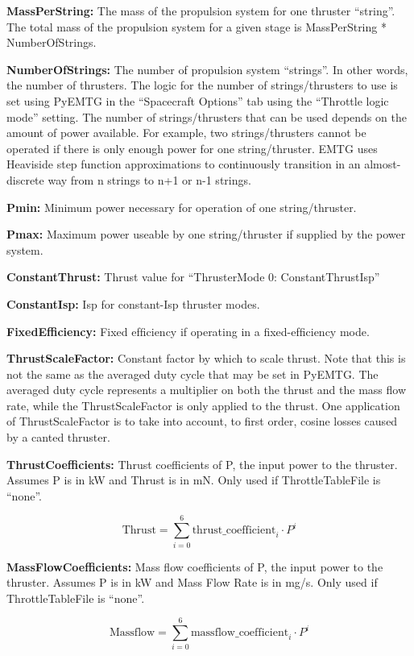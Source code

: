 \documentclass[11pt]{article}
\begin{document}
\noindent \textbf{MassPerString:} The mass of the propulsion system for one thruster ``string''. The total mass of the propulsion system for a given stage is MassPerString * NumberOfStrings. 

\noindent \textbf{NumberOfStrings:} The number of propulsion system ``strings''. In other words, the number of thrusters. The logic for the number of strings/thrusters to use is set using PyEMTG in the ``Spacecraft Options'' tab using the ``Throttle logic mode'' setting. The number of strings/thrusters that can be used depends on the amount of power available. For example, two strings/thrusters cannot be operated if there is only enough power for one string/thruster. \ac{EMTG} uses Heaviside step function approximations to continuously transition in an almost-discrete way from n strings to n+1 or n-1 strings.

\noindent \textbf{Pmin:} Minimum power necessary for operation of one string/thruster.

\noindent \textbf{Pmax:} Maximum power useable by one string/thruster if supplied by the power system.

\noindent \textbf{ConstantThrust:} Thrust value for ``ThrusterMode 0: ConstantThrustIsp''

\noindent \textbf{ConstantIsp:} Isp for constant-Isp thruster modes.

\noindent \textbf{FixedEfficiency:} Fixed efﬁciency if operating in a ﬁxed-efﬁciency mode.

\noindent \textbf{ThrustScaleFactor:} Constant factor by which to scale thrust. Note that this is not the same as the averaged duty cycle that may be set in PyEMTG. The averaged duty cycle represents a multiplier on both the thrust and the mass flow rate, while the ThrustScaleFactor is only applied to the thrust. One application of ThrustScaleFactor is to take into account, to first order, cosine losses caused by a canted thruster.

\noindent \textbf{ThrustCoefficients:} Thrust coefficients of P, the input power to the thruster. Assumes P is in kW and Thrust is in mN. Only used if ThrottleTableFile is ``none''.

\[ \mathrm{Thrust} = \sum_{i=0}^6 \mathrm{thrust\_coefficient}_i \cdot P^i \]

\noindent \textbf{MassFlowCoefficients:} Mass flow coefficients of P, the input power to the thruster. Assumes P is in kW and Mass Flow Rate is in mg/s. Only used if ThrottleTableFile is ``none''.

\[ \mathrm{Massflow} = \sum_{i=0}^6 \mathrm{massflow\_coefficient}_i \cdot P^i \]
\end{document}
